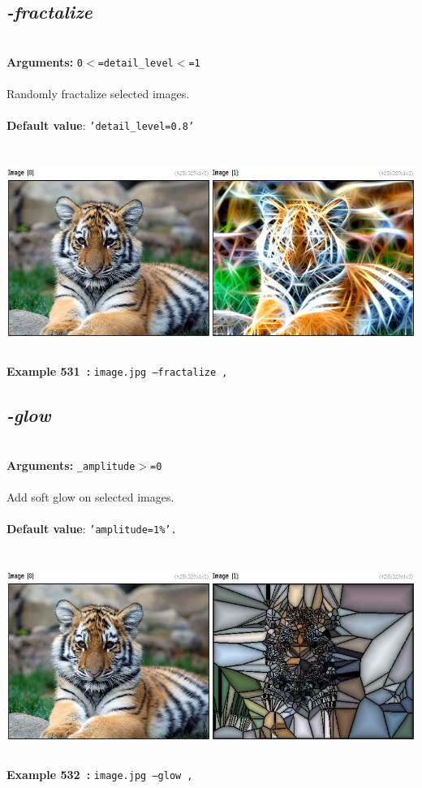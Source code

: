 \documentclass[a4paper,11pt,twoside]{book}
\begin{document}
\subsection{\emph{-fractalize} }\vspace*{-0.5em}
~\\\textbf{Arguments: } 
{\small \texttt{0$<$=detail\_level$<$=1}}\\~\\
Randomly fractalize selected images.
~\\~\\\textbf{Default value}: {\small \texttt{'detail\_level=0.8'}}
\begin{center}\includegraphics[keepaspectratio=true,height=7cm,width=\textwidth]{img/gmic_def531.jpg}\\
{\footnotesize \textbf{Example 531~:} \texttt{image.jpg --fractalize ,}}
\end{center}

\subsection{\emph{-glow} }\vspace*{-0.5em}
~\\\textbf{Arguments: } 
{\small \texttt{\_amplitude$>$=0}}\\~\\
Add soft glow on selected images.
~\\~\\\textbf{Default value}: {\small \texttt{'amplitude=1\%'.}}
\begin{center}\includegraphics[keepaspectratio=true,height=7cm,width=\textwidth]{img/gmic_def532.jpg}\\
{\footnotesize \textbf{Example 532~:} \texttt{image.jpg --glow ,}}
\end{center}
\end{document}
